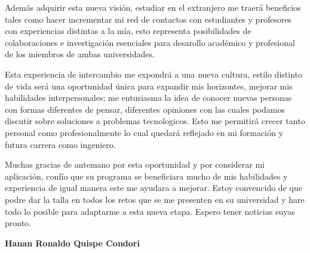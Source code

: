 \documentclass[12pt,a4paper,roman]{moderncv} %
\begin{document}
Además adquirir esta nueva visión, estudiar en el extranjero me traerá beneficios tales como hacer incrementar mi red de contactos con estudiantes y profesores con experiencias distintas a la mía, esto representa posibilidades de colaboraciones e investigación esenciales para desarollo académico y profesional de los miembros de ambas universidades.

Esta experiencia de intercambio me expondrá a una nueva cultura, estilo distinto de vida será una oportunidad única para expandir mis horizontes, mejorar mis habilidades interpersonales; me entusiasma la idea de conocer nuevas personas con formas diferentes de pensar, diferentes opiniones con las cuales podamos discutir sobre soluciones a problemas tecnologicos. Esto me permitirá crecer tanto personal como profesionalmente lo cual quedará reflejado en mi formación y futura carrera como ingeniero.

Muchas gracias de antemano por esta oportunidad y por considerar mi aplicación, confío que su programa se beneficiara mucho de mis habilidades y experiencia de igual manera este me ayudara a mejorar. Estoy convencido de que podre dar la talla en todos los retos que se me presenten en su universidad y hare todo lo posible para adaptarme a esta nueva etapa. Espero tener noticias suyas pronto.


\vfill
\textbf{Hanan Ronaldo Quispe Condori}
\end{document}
